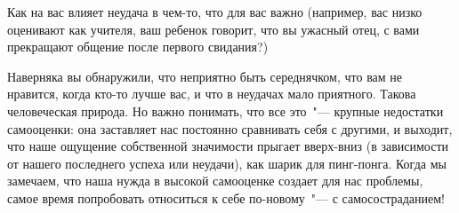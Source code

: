 \newpage


Как на вас влияет неудача в чем-то, что для вас важно (например, вас низко оценивают как учителя, ваш ребенок говорит, что вы ужасный отец, с вами прекращают общение после первого свидания?)

\vfill


\vspace{3ex}

Наверняка вы обнаружили, что неприятно быть середнячком, что вам не нравится, когда кто-то лучше вас, и что в неудачах мало приятного. Такова человеческая природа. Но важно понимать, что все это~"--- крупные недостатки самооценки: она заставляет нас постоянно сравнивать себя с другими, и выходит, что наше ощущение собственной значимости прыгает вверх-вниз (в зависимости от нашего последнего успеха или неудачи), как шарик для пинг-понга. Когда мы замечаем, что наша нужда в высокой самооценке создает для нас проблемы, самое время попробовать относиться к себе по-новому~"--- с самосостраданием! 

